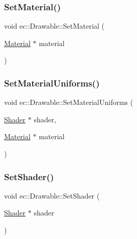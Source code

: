 \mbox{\label{classec_1_1_drawable_aa8ba7c6c76055a776a9e205684c3fa0e}} 
\subsubsection{\texorpdfstring{Set\+Material()}{SetMaterial()}}
{\footnotesize\ttfamily void ec\+::\+Drawable\+::\+Set\+Material (\begin{DoxyParamCaption}\item[{\mbox{\hyperlink{classec_1_1_material}{Material}} $\ast$}]{material }\end{DoxyParamCaption})}

\mbox{\label{classec_1_1_drawable_afe174a2651c09564efea6f88c7715d96}} 
\subsubsection{\texorpdfstring{Set\+Material\+Uniforms()}{SetMaterialUniforms()}}
{\footnotesize\ttfamily void ec\+::\+Drawable\+::\+Set\+Material\+Uniforms (\begin{DoxyParamCaption}\item[{\mbox{\hyperlink{classec_1_1_shader}{Shader}} $\ast$}]{shader,  }\item[{\mbox{\hyperlink{classec_1_1_material}{Material}} $\ast$}]{material }\end{DoxyParamCaption})\hspace{0.3cm}{\ttfamily [protected]}}

\mbox{\label{classec_1_1_drawable_adad2ef8dba9e5dbe257344f3dc9e2dec}} 
\subsubsection{\texorpdfstring{Set\+Shader()}{SetShader()}}
{\footnotesize\ttfamily void ec\+::\+Drawable\+::\+Set\+Shader (\begin{DoxyParamCaption}\item[{\mbox{\hyperlink{classec_1_1_shader}{Shader}} $\ast$}]{shader }\end{DoxyParamCaption})}



